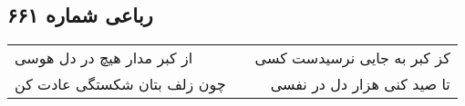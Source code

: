 \begin{center}
\section*{رباعی شماره ۶۶۱}
\label{sec:sh661}
\begin{longtable}{l p{0.5cm} r}
از کبر مدار هیچ در دل هوسی
&&
کز کبر به جایی نرسیدست کسی
\\
چون زلف بتان شکستگی عادت کن
&&
تا صید کنی هزار دل در نفسی
\\
\end{longtable}
\end{center}
